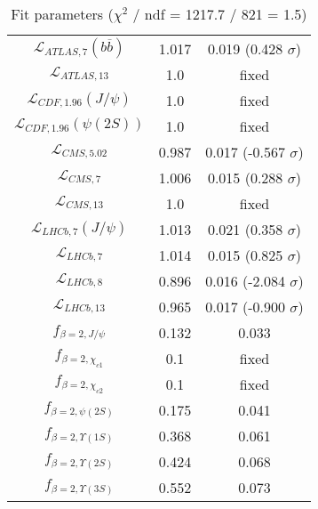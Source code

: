 \begin{table}[h!]
\begin{tabular}{c|c|c}
$\mathcal L_{ATLAS,7}(b\overline b)$ & 1.017 & 0.019 (0.428 $\sigma$) \\
$\mathcal L_{ATLAS,13}$ & 1.0 & fixed \\
$\mathcal L_{CDF,1.96}(J/\psi)$ & 1.0 & fixed \\
$\mathcal L_{CDF,1.96}(\psi(2S))$ & 1.0 & fixed \\
$\mathcal L_{CMS,5.02}$ & 0.987 & 0.017 (-0.567 $\sigma$) \\
$\mathcal L_{CMS,7}$ & 1.006 & 0.015 (0.288 $\sigma$) \\
$\mathcal L_{CMS,13}$ & 1.0 & fixed \\
$\mathcal L_{LHCb,7}(J/\psi)$ & 1.013 & 0.021 (0.358 $\sigma$) \\
$\mathcal L_{LHCb,7}$ & 1.014 & 0.015 (0.825 $\sigma$) \\
$\mathcal L_{LHCb,8}$ & 0.896 & 0.016 (-2.084 $\sigma$) \\
$\mathcal L_{LHCb,13}$ & 0.965 & 0.017 (-0.900 $\sigma$) \\
$f_{\beta=2,J/\psi}$ & 0.132 & 0.033 \\
$f_{\beta=2,\chi_{c1}}$ & 0.1 & fixed \\
$f_{\beta=2,\chi_{c2}}$ & 0.1 & fixed \\
$f_{\beta=2,\psi(2S)}$ & 0.175 & 0.041 \\
$f_{\beta=2,\Upsilon(1S)}$ & 0.368 & 0.061 \\
$f_{\beta=2,\Upsilon(2S)}$ & 0.424 & 0.068 \\
$f_{\beta=2,\Upsilon(3S)}$ & 0.552 & 0.073 \\
\end{tabular}
\caption{Fit parameters ($\chi^2$ / ndf = 1217.7 / 821 = 1.5)}
\end{table}
